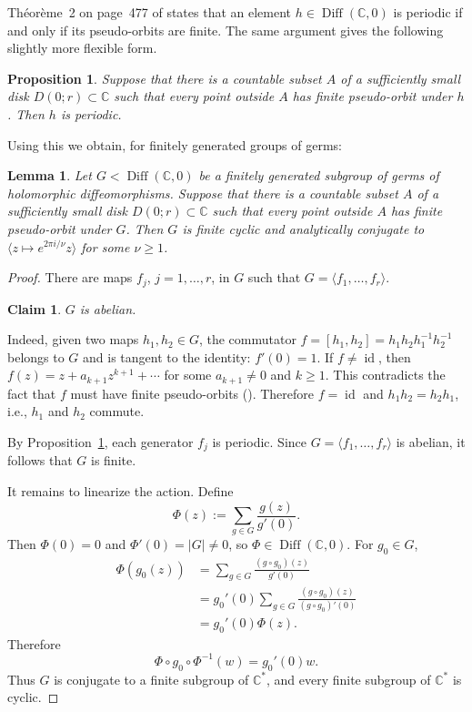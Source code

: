 \documentclass[11pt,twoside]{amsart}
\newtheorem{lema}{Lemma}
\newtheorem{claim}{Claim}
\newtheorem{propo}{Proposition}
\theoremstyle{definition}
\begin{document}
Th\'eor\`eme~2 on page~477 of \cite{MatteiMoussu1980} states that an
element $h\in\operatorname{Diff}(\mathbb C,0)$ is periodic if and only if
its pseudo-orbits are finite. The same argument gives the following
slightly more flexible form.


\begin{propo}
\label{Proposition:finiteorbits}
 Suppose that there is a
countable subset $A$ of a sufficiently small  disk $D(0;r)\subset \mathbb C$ such that every
point outside $A$ has finite pseudo-orbit under $h$. Then $h$ is periodic.
\end{propo}
Using this we obtain, for finitely generated groups of germs:

\begin{lema}\label{lemma:finite-holonomy}\normalfont Let $G<\operatorname{Diff}(\mathbb C, 0)$ be a finitely generated subgroup of germs of holomorphic diffeomorphisms.
 Suppose that there is a
countable subset $A$ of a sufficiently small  disk $D(0;r)\subset \mathbb C$ such that every
point outside $A$ has finite pseudo-orbit under $G$.
 Then $G$ is finite cyclic and analytically conjugate to
 $\langle z\mapsto e^{2\pi i/\nu}z\rangle$ for some $\nu\geq1$.
\end{lema}

\begin{proof} There are maps $f_j$, $j=1,\ldots,r$, in $G$ such that
$G=\langle f_1,\ldots,f_r\rangle$.
\begin{claim} $G$ is abelian.
\end{claim}

Indeed, given two maps $h_{1},h_{2}\in G$, the commutator
$f=[h_{1},h_{2}]=h_{1}h_{2}h_{1}^{-1}h_{2}^{-1}$ belongs to $G$ and is
tangent to the identity: $f'(0)=1$. If $f\neq\operatorname{id}$, then
$f(z)=z+a_{k+1}z^{k+1}+\cdots$ for some $a_{k+1}\neq0$ and $k\geq1$.
This contradicts the fact that $f$ must have finite pseudo-orbits
(\cite{Camacho1978}). Therefore $f=\operatorname{id}$ and
$h_{1}h_{2}=h_{2}h_{1}$, i.e., $h_{1}$ and $h_{2}$ commute.

By Proposition~\ref{Proposition:finiteorbits}, each generator $f_j$ is
periodic. Since $G=\langle f_1,\ldots,f_r\rangle$ is abelian, it follows
that $G$ is finite.

It remains to linearize the action. Define
\[
\Phi(z):=\sum_{g\in G}\frac{g(z)}{g'(0)}.
\]
Then $\Phi(0)=0$ and $\Phi'(0)=|G|\neq0$, so
$\Phi\in\operatorname{Diff}(\mathbb C,0)$. For $g_0\in G$,
\[
\begin{aligned}
\Phi(g_0(z))
&=\sum_{g\in G}\frac{(g\circ g_0)(z)}{g'(0)}\\
&=g_0'(0)\sum_{g\in G}
  \frac{(g\circ g_0)(z)}{(g\circ g_0)'(0)}\\
&=g_0'(0)\Phi(z).
\end{aligned}
\]
Therefore
\[
\Phi\circ g_0\circ\Phi^{-1}(w)=g_0'(0)w.
\]
Thus $G$ is conjugate to a finite subgroup of $\mathbb C^*$, and every
finite subgroup of $\mathbb C^*$ is cyclic.
\end{proof}
\end{document}

